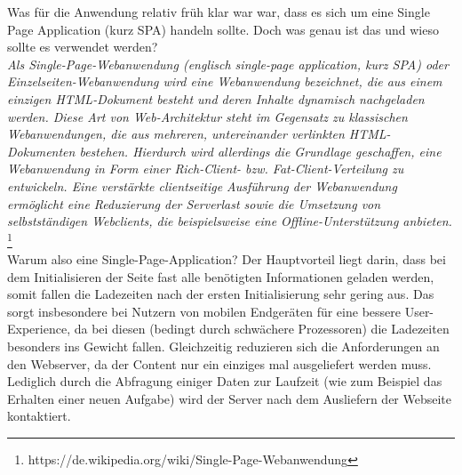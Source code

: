 Was für die Anwendung relativ früh klar war war, dass es sich um eine Single Page Application (kurz SPA) handeln sollte. Doch was genau ist das und wieso sollte es verwendet werden? \\


\emph{\glqq   
Als Single-Page-Webanwendung (englisch single-page application, kurz SPA) oder Einzelseiten-Webanwendung wird eine Webanwendung bezeichnet, die aus einem einzigen HTML-Dokument besteht und deren Inhalte dynamisch nachgeladen werden. Diese Art von Web-Architektur steht im Gegensatz zu klassischen Webanwendungen, die aus mehreren, untereinander verlinkten HTML-Dokumenten bestehen. Hierdurch wird allerdings die Grundlage geschaffen, eine Webanwendung in Form einer Rich-Client- bzw. Fat-Client-Verteilung zu entwickeln. Eine verstärkte clientseitige Ausführung der Webanwendung ermöglicht eine Reduzierung der Serverlast sowie die Umsetzung von selbstständigen Webclients, die beispielsweise eine Offline-Unterstützung anbieten.
\grqq} \footnote{https://de.wikipedia.org/wiki/Single-Page-Webanwendung} \\

Warum also eine Single-Page-Application? Der Hauptvorteil liegt darin, dass bei dem Initialisieren der Seite fast alle benötigten Informationen geladen werden, somit fallen die Ladezeiten nach der ersten Initialisierung sehr gering aus. Das sorgt insbesondere bei Nutzern von mobilen Endgeräten für eine bessere User-Experience, da bei diesen (bedingt durch schwächere Prozessoren) die Ladezeiten besonders ins Gewicht fallen. Gleichzeitig reduzieren sich die Anforderungen an den Webserver, da der Content nur ein einziges mal ausgeliefert werden muss. Lediglich durch die Abfragung einiger Daten zur Laufzeit (wie zum Beispiel das Erhalten einer neuen Aufgabe) wird der Server nach dem Ausliefern der Webseite kontaktiert.\\

